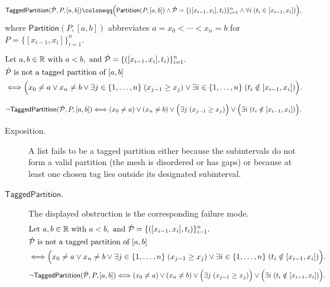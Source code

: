 \begin{remark*}
\[
\mathsf{TaggedPartition}(\dot{\mathcal{P}},P,[a,b])
\coloneqq
\Bigl(\mathsf{Partition}(P,[a,b]) \land \dot{\mathcal{P}}=\{([x_{i-1},x_i],t_i)\}_{i=1}^n \land \forall i\;(t_i \in [x_{i-1},x_i])\Bigr),
\]
where $\mathsf{Partition}(P,[a,b])$ abbreviates $a=x_0<\cdots<x_n=b$ for $P=\{[x_{i-1},x_i]\}_{i=1}^n$.
\end{remark*}

\begin{remark*}
\[
\begin{aligned}
&\text{Let } a,b \in \mathbb{R} \text{ with } a<b, \text{ and } \dot{\mathcal{P}}=\{([x_{i-1},x_i],t_i)\}_{i=1}^n.\\
&\dot{\mathcal{P}} \text{ is not a tagged partition of } [a,b]\\
&\Longleftrightarrow
\Bigl(x_0\ne a \lor x_n\ne b \lor
\exists j \in \{1,\ldots,n\}\;(x_{j-1} \ge x_j) \lor
\exists i \in \{1,\ldots,n\}\;(t_i \notin [x_{i-1},x_i])\Bigr).
\end{aligned}
\]
\end{remark*}

\begin{remark*}
\[
\neg\mathsf{TaggedPartition}(\dot{\mathcal{P}},P,[a,b])
\Longleftrightarrow
(x_0\ne a)\lor(x_n\ne b)\lor
\Bigl(\exists j\;(x_{j-1} \ge x_j)\Bigr) \lor \Bigl(\exists i\;(t_i \notin [x_{i-1},x_i])\Bigr).
\]
\end{remark*}

\begin{remark*}
\begin{description}
  \item[Exposition.]
A list fails to be a tagged partition either because the subintervals do not form a valid partition (the mesh is disordered or has gaps) or because at least one chosen tag lies outside its designated subinterval.


  \item[\(\mathsf{TaggedPartition}.\)]
  The displayed obstruction is the corresponding failure mode.
  \[
\begin{aligned}
&\text{Let } a,b \in \mathbb{R} \text{ with } a<b, \text{ and } \dot{\mathcal{P}}=\{([x_{i-1},x_i],t_i)\}_{i=1}^n.\\
&\dot{\mathcal{P}} \text{ is not a tagged partition of } [a,b]\\
&\Longleftrightarrow
\Bigl(x_0\ne a \lor x_n\ne b \lor
\exists j \in \{1,\ldots,n\}\;(x_{j-1} \ge x_j) \lor
\exists i \in \{1,\ldots,n\}\;(t_i \notin [x_{i-1},x_i])\Bigr).
\end{aligned}
  \]
  \[
\neg\mathsf{TaggedPartition}(\dot{\mathcal{P}},P,[a,b])
\Longleftrightarrow
(x_0\ne a)\lor(x_n\ne b)\lor
\Bigl(\exists j\;(x_{j-1} \ge x_j)\Bigr) \lor \Bigl(\exists i\;(t_i \notin [x_{i-1},x_i])\Bigr).
  \]
\end{description}
\end{remark*}

